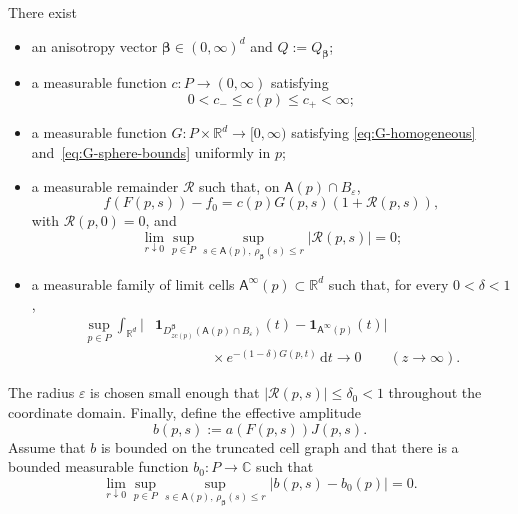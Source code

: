 \documentclass[10pt,a4paper]{amsart}
\newcommand{\Afib}{\mathsf{A}}
\newcommand{\C}{\mathbb{C}}
\newcommand{\R}{\mathbb{R}}
\newcommand{\dd}{\,\mathrm{d}}
\newcommand{\eps}{\varepsilon}
\newcommand{\ind}{\mathbf{1}}
\begin{document}
\begin{assumption}\label{ass:leading-model}
There exist
\begin{itemize}[leftmargin=2.2em]
\item an anisotropy vector $\bm\beta\in(0,\infty)^d$ and
  $Q:=Q_{\bm\beta}$;
\item a measurable function $c:P\to(0,\infty)$ satisfying
  \begin{equation}\label{eq:c-bounds}
    0<c_-\le c(p)\le c_+<\infty;
  \end{equation}
\item a measurable function $G:P\times\R^d\to[0,\infty)$ satisfying
  \eqref{eq:G-homogeneous} and~\eqref{eq:G-sphere-bounds} uniformly in $p$;
\item a measurable remainder $\mathcal R$ such that, on $\Afib(p)\cap B_\eps$,
  \begin{equation}\label{eq:phase-leading}
    f(F(p,s))-f_0=c(p)G(p,s)(1+\mathcal R(p,s)),
  \end{equation}
  with $\mathcal R(p,0)=0$, and
  \begin{equation}\label{eq:R-uniform}
    \lim_{r\downarrow0}\sup_{p\in P}
    \sup_{s\in\Afib(p),\,\rho_{\bm\beta}(s)\le r}|\mathcal R(p,s)|=0;
  \end{equation}
\item a measurable family of limit cells
  $\Afib^\infty(p)\subset\R^d$ such that, for every $0<\delta<1$,
  \begin{equation}\label{eq:weighted-cell-limit}
  \begin{split}
   \sup_{p\in P}\int_{\R^d}
   \Big|&\ind_{D_{zc(p)}^{\bm\beta}(\Afib(p)\cap B_\eps)}(t)
        -\ind_{\Afib^\infty(p)}(t)\Big|\\
   &\hspace{4em}\times e^{-(1-\delta)G(p,t)}\dd t
   \longrightarrow0
   \qquad(z\to\infty).
  \end{split}
  \end{equation}
\end{itemize}
The radius $\eps$ is chosen small enough that $|\mathcal R(p,s)|\le\delta_0<1$
throughout the coordinate domain.  Finally, define the effective amplitude
\begin{equation}\label{eq:effective-amplitude}
  b(p,s):=a(F(p,s))J(p,s).
\end{equation}
Assume that $b$ is bounded on the truncated cell graph and that there is a
bounded measurable function $b_0:P\to\C$ such that
\begin{equation}\label{eq:amplitude-uniform}
  \lim_{r\downarrow0}\sup_{p\in P}
  \sup_{s\in\Afib(p),\,\rho_{\bm\beta}(s)\le r}
  |b(p,s)-b_0(p)|=0.
\end{equation}
\end{assumption}
\end{document}
